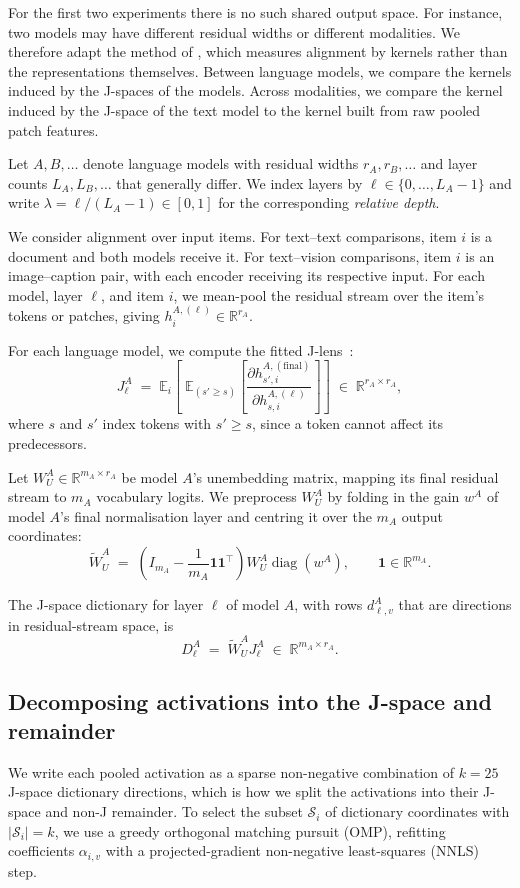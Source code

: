 \documentclass{article}
\begin{document}
For the first two experiments there is no such shared output space. For
instance, two models may have different residual widths or different
modalities. We therefore adapt the method of \citet{huh2024platonic}, which
measures alignment by kernels rather than
the representations themselves. Between language models, we compare the kernels induced by the J-spaces of
the models. Across modalities, we compare the kernel induced by the J-space of
the text model to the kernel built from raw pooled patch features.

Let $A, B,\dots$ denote language models with residual widths $r_A, r_B, \dots$
and layer counts $L_A, L_B, \dots$ that generally differ. We index layers by
$\ell \in \{0,\dots,L_A-1\}$ and write $\lambda = \ell/(L_A-1) \in [0,1]$ for the
corresponding \emph{relative depth}.

We consider alignment over input items. For
text--text comparisons, item $i$ is a document and both models receive it. For text--vision comparisons, item $i$ is an image--caption pair, with each encoder receiving its respective input. For each model, layer $\ell$, and item $i$, we mean-pool the residual stream over the item's tokens or patches, giving $h^{A,(\ell)}_i \in \mathbb{R}^{r_A}$.

For each language model, we compute the fitted J-lens~\citep{gurnee2026verbalizable}:
\[
  J^A_\ell \;=\;
  \mathbb{E}_{i}\!\left[\;
    \mathbb{E}_{(s' \geq s)}\!
    \left[ \frac{\partial h^{A,(\mathrm{final})}_{s',i}}
      {\partial h^{A,(\ell)}_{s,i}} \right]
    \right]
  \;\in\; \mathbb{R}^{r_A \times r_A},
\]
where $s$ and $s'$ index tokens with $s' \geq s$, since a token cannot affect
its predecessors.

Let $W_U^A \in \mathbb{R}^{m_A \times r_A}$ be model $A$'s unembedding matrix,
mapping its final residual stream to $m_A$ vocabulary logits. We preprocess
$W_U^A$ by folding in the gain $w^A$ of model $A$'s final normalisation layer and centring it over the $m_A$ output coordinates:
\[
  \widetilde{W}_U^A \;=\; \left(I_{m_A} - \frac{1}{m_A}\mathbf{1}\mathbf{1}^{\top}\right) W_U^A \operatorname{diag}(w^A), \qquad \mathbf{1}\in\mathbb{R}^{m_A}.
\]

The J-space dictionary for layer $\ell$ of model $A$, with rows $d^A_{\ell,v}$ that are directions in residual-stream space, is
\[  D^A_\ell \;=\; \widetilde{W}_U^A J^A_\ell \;\in\; \mathbb{R}^{m_A \times r_A}.
\]

\subsection{Decomposing activations into the J-space and remainder}
We write each pooled activation as a sparse non-negative combination of $k=25$ J-space dictionary directions, which is how we split the activations into their J-space and non-J remainder. To select the subset $\mathcal{S}_i$ of dictionary coordinates with $|\mathcal{S}_i|=k$, we use a greedy orthogonal matching pursuit (OMP), refitting coefficients $\alpha_{i,v}$ with a projected-gradient non-negative least-squares (NNLS) step. 
\end{document}
